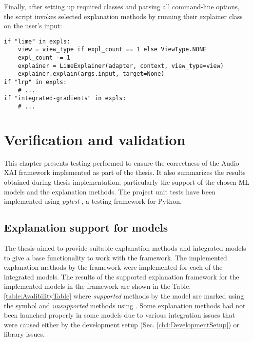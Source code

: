 \documentclass[
    bindingoffset=5mm,  %
    footnoteindent=3mm, %
    hyphenation=true    %
]{src/wut-thesis}
\newcommand{\cmark}{\ding{51}} %
\newcommand{\xmark}{\ding{55}} %
\begin{document}
Finally, after setting up required classes and parsing all command-line options,
the script invokes selected explanation methods by running their
explainer class on the user’s input:

\begin{verbatim}
if "lime" in expls:
    view = view_type if expl_count == 1 else ViewType.NONE
    expl_count -= 1
    explainer = LimeExplainer(adapter, context, view_type=view)
    explainer.explain(args.input, target=None)
if "lrp" in expls:
    # ...
if "integrated-gradients" in expls:
    # ...
\end{verbatim}

%
%
\clearpage %
\section{Verification and validation} \label{ch:verification}

This chapter presents testing performed to ensure the correctness of the Audio XAI framework
implemented as part of the thesis. It also summarizes the results obtained during thesis implementation,
particularly the support of the chosen ML models and the explanation methods.
The project unit tests have been implemented using \emph{pytest} \cite{PytestDoc}, a testing framework for Python.

\subsection{Explanation support for models}

The thesis aimed to provide suitable explanation methods and integrated models to give a base functionality
to work with the framework. The implemented explanation methods by the framework were implemented for
each of the integrated models. The results of the supported explanation framework for the implemented models
in the framework are shown in the Table. \ref{table:AvalibilityTable} where \emph{supported} methods by the model
are marked using the symbol \cmark and \emph{unsupported} methods using \xmark. Some explanation methods had not
been launched properly in some models due to various integration issues that were caused either by the development
setup (Sec. \ref{ch4:DevelopmentSetup}) or library issues.
\end{document}
